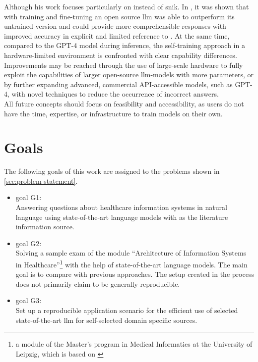 Although his work focuses particularly on \citet{bb2} instead of \ac{snik}.
%
In \citet{Paul_Keller}, it was shown that with training and fine-tuning an open source \ac{llm} was able to outperform its untrained version and could provide more comprehensible responses with improved accuracy in explicit and limited reference to \citet{bb2}.
At the same time, compared to the GPT-4 model during inference, the self-training approach in a hardware-limited environment is confronted with clear capability differences.
%
Improvements may be reached through the use of large-scale hardware to fully exploit the capabilities of larger open-source \ac{llm}-models with more parameters, or by further expanding advanced, commercial API-accessible models, such as GPT-4, with novel techniques to reduce the occurrence of incorrect answers.\\
%
All future concepts should focus on feasibility and accessibility, as users do not have the time, expertise, or infrastructure to train models on their own.

\section{Goals}\label{sec:goals}
The following goals of this work are assigned to the problems shown in \cref{sec:problem statement}.
\begin{itemize}
  \item goal G1:\\
    Answering questions about healthcare information systems in natural language using state-of-the-art language models with \citet{bb2} as the literature information source. 
  \item goal G2:\\
   Solving a sample exam of the module \enquote{Architecture of Information Systems in Healthcare}\footnote{\raggedright{}a module of the Master's program in Medical Informatics at the University of Leipzig, which is based on \citet{bb2}} with the help of state-of-the-art language models.
   The main goal is to compare with previous approaches.
   The setup created in the process does not primarily claim to be generally reproducible.
   \item goal G3:\\
   Set up a reproducible application scenario for the efficient use of selected state-of-the-art \ac{llm} for self-selected domain specific sources.
\end{itemize}
